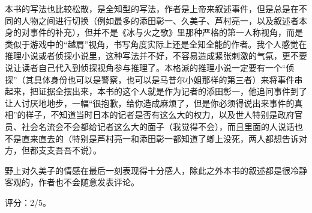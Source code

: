 本书的写法也比较松散，是全知型的写法，作者是上帝来叙述事件，但是总是在不同的人物之间进行切换（例如最多的添田彰一、久美子、芦村亮一，以及叙述者本身的对事件的补充），但并不是《冰与火之歌》里那种严格的第一人称视角，而是类似于游戏中的“越肩”视角，书写角度实际上还是全知全能的作者。我个人感觉在推理小说或者侦探小说里，这种写法并不好，不容易造成紧张刺激的气氛，更不要说让读者自己代入到侦探视角参与推理了。本格派的推理小说一定要有一个“侦探”（其具体身份也可以是警察，也可以是马普尔小姐那样的第三者）来将事件串起来，把证据全摆出来，本书的这个人就是作为记者的添田彰一，他追问事件到了让人讨厌地地步，一幅“很抱歉，给你造成麻烦了，但是你必须得说出来事件的真相”的样子，不知道当时日本的记者是否有这么大的权力，以及世人特别是政府官员、社会名流会不会都给记者这么大的面子（我觉得不会），而且里面的人说话也不是直来直去的（特别是芦村亮一和添田彰一都知道了蝍上没死，两人都想告诉对方，但都支支吾吾不说）。

野上对久美子的情感在最后一刻表现得十分感人，除此之外本书的叙述都是很冷静客观的，作者也不会随意发表评论。

评分：2/5。